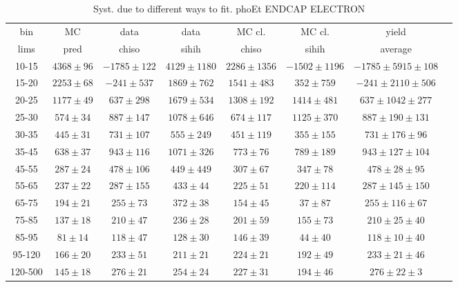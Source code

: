 \begin{table}[h]
  \scriptsize
  \begin{center}
  \caption{Syst. due to different ways to fit. phoEt ENDCAP ELECTRON}
  \begin{tabular}{|c|c|c|c|c|c|c|c|}
    bin &  MC   & data  & data  & MC cl. & MC cl. & yield\\ 
    lims & pred & chiso & sihih & chiso  & sihih  & average \\ \hline
     10-15 & $4368\pm96$ & $-1785\pm122$ & $4129\pm1180$ & $2286\pm1356$ & $-1502\pm1196$ &$-1785\pm5915\pm108$  \\ \hline
    15-20 & $2253\pm68$ & $-241\pm537$ & $1869\pm762$ & $1541\pm483$ & $352\pm759$ &$-241\pm2110\pm506$  \\ \hline
    20-25 & $1177\pm49$ & $637\pm298$ & $1679\pm534$ & $1308\pm192$ & $1414\pm481$ &$637\pm1042\pm277$  \\ \hline
    25-30 & $574\pm34$ & $887\pm147$ & $1078\pm646$ & $674\pm117$ & $1125\pm370$ &$887\pm190\pm131$  \\ \hline
    30-35 & $445\pm31$ & $731\pm107$ & $555\pm249$ & $451\pm119$ & $355\pm155$ &$731\pm176\pm96$  \\ \hline
    35-45 & $638\pm37$ & $943\pm116$ & $1071\pm326$ & $773\pm76$ & $789\pm189$ &$943\pm127\pm104$  \\ \hline
    45-55 & $287\pm24$ & $478\pm106$ & $449\pm449$ & $307\pm67$ & $347\pm78$ &$478\pm28\pm95$  \\ \hline
    55-65 & $237\pm22$ & $287\pm155$ & $433\pm44$ & $225\pm51$ & $220\pm114$ &$287\pm145\pm150$  \\ \hline
    65-75 & $194\pm21$ & $255\pm73$ & $372\pm38$ & $154\pm45$ & $37\pm87$ &$255\pm116\pm67$  \\ \hline
    75-85 & $137\pm18$ & $210\pm47$ & $236\pm28$ & $201\pm59$ & $155\pm73$ &$210\pm25\pm40$  \\ \hline
    85-95 & $81\pm14$ & $118\pm47$ & $128\pm30$ & $146\pm39$ & $44\pm40$ &$118\pm10\pm40$  \\ \hline
    95-120 & $166\pm20$ & $233\pm51$ & $211\pm21$ & $224\pm21$ & $192\pm49$ &$233\pm21\pm46$  \\ \hline
    120-500 & $145\pm18$ & $276\pm21$ & $254\pm24$ & $227\pm31$ & $194\pm46$ &$276\pm22\pm3$  \\ \hline
  \end{tabular}
  \label{tab:diff_ways_to_fit_phoEt_ENDCAP_electron}
  \end{center}
\end{table}

